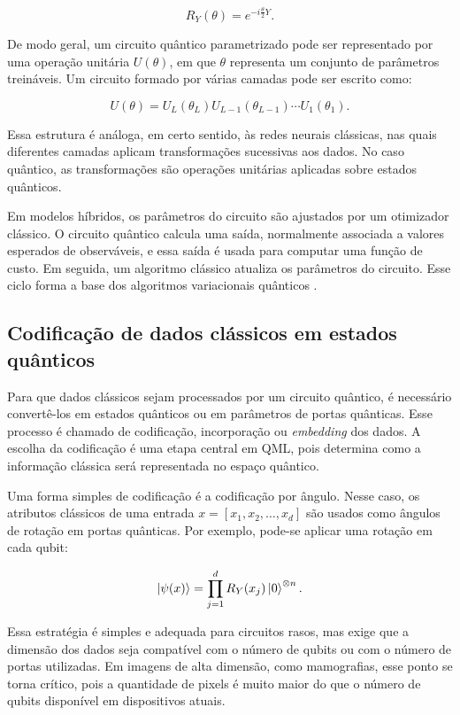 \documentclass[
    12pt,
    openright,
    oneside,
    a4paper,
    english,
    brazil
]{abntex2}
\begin{document}
\[
R_Y(\theta) =
e^{-i\frac{\theta}{2}Y}.
\]

De modo geral, um circuito quântico parametrizado pode ser representado por uma operação unitária \(U(\theta)\), em que \(\theta\) representa um conjunto de parâmetros treináveis. Um circuito formado por várias camadas pode ser escrito como:

\[
U(\theta) =
U_L(\theta_L)
U_{L-1}(\theta_{L-1})
\cdots
U_1(\theta_1).
\]

Essa estrutura é análoga, em certo sentido, às redes neurais clássicas, nas quais diferentes camadas aplicam transformações sucessivas aos dados. No caso quântico, as transformações são operações unitárias aplicadas sobre estados quânticos.

Em modelos híbridos, os parâmetros do circuito são ajustados por um otimizador clássico. O circuito quântico calcula uma saída, normalmente associada a valores esperados de observáveis, e essa saída é usada para computar uma função de custo. Em seguida, um algoritmo clássico atualiza os parâmetros do circuito. Esse ciclo forma a base dos algoritmos variacionais quânticos \cite{cerezo2021variational}.

\subsection{Codificação de dados clássicos em estados quânticos}

Para que dados clássicos sejam processados por um circuito quântico, é necessário convertê-los em estados quânticos ou em parâmetros de portas quânticas. Esse processo é chamado de codificação, incorporação ou \textit{embedding} dos dados. A escolha da codificação é uma etapa central em QML, pois determina como a informação clássica será representada no espaço quântico.

Uma forma simples de codificação é a codificação por ângulo. Nesse caso, os atributos clássicos de uma entrada \(x = [x_1, x_2, \ldots, x_d]\) são usados como ângulos de rotação em portas quânticas. Por exemplo, pode-se aplicar uma rotação em cada qubit:

\[
\ket{\psi(x)}
=
\prod_{j=1}^{d}
R_Y(x_j)
\ket{0}^{\otimes n}.
\]

Essa estratégia é simples e adequada para circuitos rasos, mas exige que a dimensão dos dados seja compatível com o número de qubits ou com o número de portas utilizadas. Em imagens de alta dimensão, como mamografias, esse ponto se torna crítico, pois a quantidade de pixels é muito maior do que o número de qubits disponível em dispositivos atuais.
\end{document}
